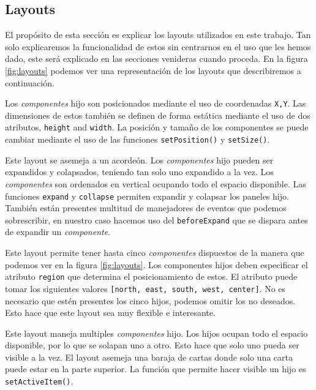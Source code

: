 	\subsection{Layouts}
		El propósito de esta sección es explicar los layouts utilizados en este trabajo. Tan solo explicaremos la funcionalidad de estos sin
		centrarnos en el uso que les hemos dado, este será explicado en las secciones venideras cuando proceda. En la figura \ref{fig:layouts}
		podemos ver una representación de los layouts que describiremos a continuación.
		\begin{description}[style=unboxed,leftmargin=0cm,labelwidth=1cm]
			\item[\texttt{Absolute}] Los \emph{componentes} hijo son posicionados mediante el uso de coordenadas \texttt{X,Y}. Las
			  dimensiones de estos también se definen de forma estática mediante el uso de dos atributos, \texttt{height} and
			  \texttt{width}. La posición y tamaño de los componentes se puede cambiar mediante el uso de las funciones
			  \texttt{setPosition()} y \texttt{setSize()}.
			\item[\texttt{Accordion}] Este layout se asemeja a un acordeón. Los \emph{componentes} hijo pueden ser expandidos y
			  colapsados, teniendo tan solo uno expandido a la vez. Los \emph{componentes} son ordenados en vertical ocupando todo el
			  espacio disponible. Las funciones \texttt{expand} y \texttt{collapse} permiten expandir y colapsar los paneles hijo.
			  También están presentes multitud de manejadores de eventos que podemos sobrescribir, en nuestro caso hacemos uso del
			  \texttt{beforeExpand} que se dispara antes de expandir un \emph{componente}. 
			\item[\texttt{Border}] Este layout permite tener hasta cinco \emph{componentes} dispuestos de la manera que podemos ver en la
			  figura \ref{fig:layouts}.  Los componentes hijos deben especificar el atributo \texttt{region} que determina el
			  posicionamiento de estos. El atributo puede tomar los siguientes valores \texttt{[north, east, south, west, center]}. No es
			  necesario que estén presentes los cinco hijos, podemos omitir los no deseados. Esto hace que este layout sea muy flexible e
			  interesante.
			\item[\texttt{Card}] Este layout maneja multiples \emph{componentes} hijo. Los hijos ocupan todo el espacio disponible, por lo
			  que se solapan uno a otro.  Esto hace que solo uno pueda ser visible a la vez. El layout asemeja una baraja de cartas donde
			  solo una carta puede estar en la parte superior. La función que permite hacer visible un hijo es \texttt{setActiveItem()}.

\end{description}
